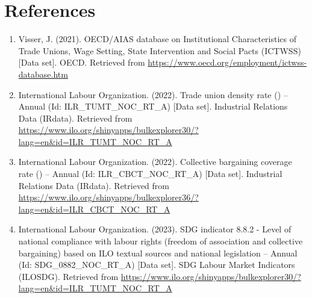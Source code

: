 \documentclass[11pt]{article}\usepackage[]{graphicx}\usepackage[]{xcolor}
\begin{document}
\section{References}
\begin{enumerate}
    \item Visser, J. (2021). OECD/AIAS database on Institutional Characteristics of Trade Unions, Wage Setting, 
      State Intervention and Social Pacts (ICTWSS) [Data set]. OECD. 
      Retrieved from 
      \url{https://www.oecd.org/employment/ictwss-database.htm}
    \item International Labour Organization. (2022). Trade union density rate () 
      -- Annual (Id: ILR\_TUMT\_NOC\_RT\_A) [Data set]. Industrial Relations Data (IRdata). 
      Retrieved from 
      \url{https://www.ilo.org/shinyapps/bulkexplorer30/?lang=en\&id=ILR\_TUMT\_NOC\_RT\_A}
    \item International Labour Organization. (2022). Collective bargaining coverage 
      rate () -- Annual (Id: ILR\_CBCT\_NOC\_RT\_A) [Data set]. 
      Industrial Relations Data (IRdata). Retrieved from 
      \url{https://www.ilo.org/shinyapps/bulkexplorer36/?lang=en\&id=ILR\_CBCT\_NOC\_RT\_A}
    \item International Labour Organization. (2023). SDG indicator 8.8.2 - 
      Level of national compliance with labour rights
      (freedom of association and collective bargaining) 
      based on ILO textual sources and national legislation -- 
      Annual (Id: SDG\_0882\_NOC\_RT\_A) [Data set]. 
      SDG Labour Market Indicators (ILOSDG). Retrieved 
      from \url{https://www.ilo.org/shinyapps/bulkexplorer30/?lang=en\&id=ILR\_TUMT\_NOC\_RT\_A}
\end{enumerate}
\end{document}
